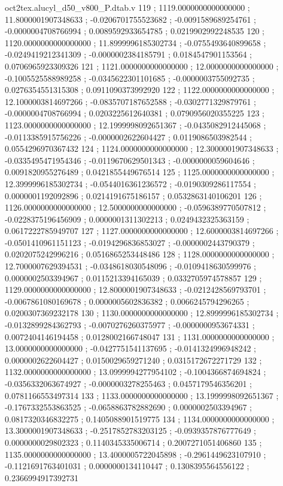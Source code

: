 \begin{filecontents}[overwrite]{oct2tex.alucyl_d50_v800_P.dtab.v}
119 ; 1119.0000000000000000 ; 11.8000001907348633 ; -0.0206701755523682 ; -0.0091589689254761 ; -0.0000004708766994 ; 0.0089592933654785 ; 0.0219902992248535
120 ; 1120.0000000000000000 ; 11.8999996185302734 ; -0.0755493640899658 ; -0.0249419212341309 ; -0.0000002384185791 ; 0.0184547901153564 ; 0.0706965923309326
121 ; 1121.0000000000000000 ; 12.0000000000000000 ; -0.1005525588989258 ; -0.0345622301101685 ; -0.0000003755092735 ; 0.0276354551315308 ; 0.0911090373992920
122 ; 1122.0000000000000000 ; 12.1000003814697266 ; -0.0835707187652588 ; -0.0302771329879761 ; -0.0000004708766994 ; 0.0203225612640381 ; 0.0790956020355225
123 ; 1123.0000000000000000 ; 12.1999998092651367 ; -0.0435082912445068 ; -0.0113385915756226 ; -0.0000002622604427 ; 0.0119086503982544 ; 0.0554296970367432
124 ; 1124.0000000000000000 ; 12.3000001907348633 ; -0.0335495471954346 ; -0.0119670629501343 ; -0.0000000059604646 ; 0.0091820955276489 ; 0.0421855449676514
125 ; 1125.0000000000000000 ; 12.3999996185302734 ; -0.0544016361236572 ; -0.0190309286117554 ; 0.0000001192092896 ; 0.0214191675186157 ; 0.0532863140106201
126 ; 1126.0000000000000000 ; 12.5000000000000000 ; -0.0596389770507812 ; -0.0228375196456909 ; 0.0000001311302213 ; 0.0249432325363159 ; 0.0617222785949707
127 ; 1127.0000000000000000 ; 12.6000003814697266 ; -0.0501410961151123 ; -0.0194296836853027 ; -0.0000002443790379 ; 0.0202075242996216 ; 0.0516865253448486
128 ; 1128.0000000000000000 ; 12.7000007629394531 ; -0.0348618030548096 ; -0.0109418630599976 ; 0.0000002503394967 ; 0.0115213394165039 ; 0.0332705974578857
129 ; 1129.0000000000000000 ; 12.8000001907348633 ; -0.0212428569793701 ; -0.0067861080169678 ; 0.0000005602836382 ; 0.0066245794296265 ; 0.0200307369232178
130 ; 1130.0000000000000000 ; 12.8999996185302734 ; -0.0132899284362793 ; -0.0070276260375977 ; -0.0000000953674331 ; 0.0072404146194458 ; 0.0128002166748047
131 ; 1131.0000000000000000 ; 13.0000000000000000 ; -0.0427751541137695 ; -0.0141324996948242 ; 0.0000002622604427 ; 0.0150029659271240 ; 0.0315172672271729
132 ; 1132.0000000000000000 ; 13.0999994277954102 ; -0.1004366874694824 ; -0.0356332063674927 ; -0.0000003278255463 ; 0.0457179546356201 ; 0.0781166553497314
133 ; 1133.0000000000000000 ; 13.1999998092651367 ; -0.1767332553863525 ; -0.0658863782882690 ; 0.0000002503394967 ; 0.0817320346832275 ; 0.1405088901519775
134 ; 1134.0000000000000000 ; 13.3000001907348633 ; -0.2517852783203125 ; -0.0939357876777649 ; 0.0000000029802323 ; 0.1140345335006714 ; 0.2007271051406860
135 ; 1135.0000000000000000 ; 13.4000005722045898 ; -0.2961449623107910 ; -0.1121691763401031 ; 0.0000000134110447 ; 0.1308395564556122 ; 0.2366994917392731

\end{filecontents}
